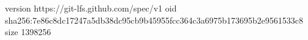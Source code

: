 version https://git-lfs.github.com/spec/v1
oid sha256:7e86c8dc17247a5db38dc95cb9b45955fcc364c3a6975b173695b2e9561533c8
size 1398256

